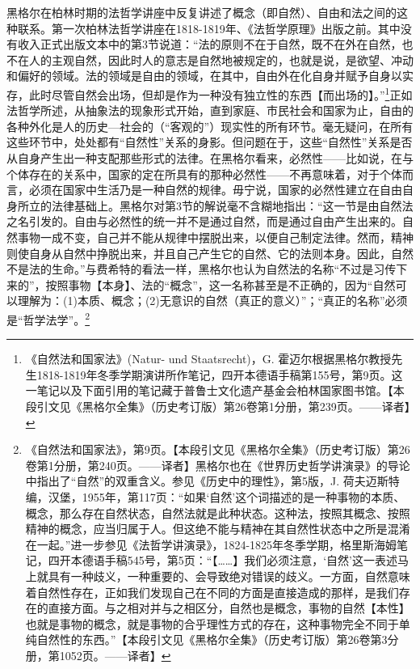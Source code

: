 黑格尔在柏林时期的法哲学讲座中反复讲述了概念（即自然）、自由和法之间的这种联系。第一次柏林法哲学讲座在1818-1819年、《法哲学原理》出版之前。其中没有收入正式出版文本中的第3节说道：“法的原则不在于自然，既不在外在自然，也不在人的主观自然，因此时人的意志是自然地被规定的，也就是说，是欲望、冲动和偏好的领域。法的领域是自由的领域，在其中，自由外在化自身并赋予自身以实存，此时尽管自然会出场，但却是作为一种没有独立性的东西【而出场的】。”\footnote{《自然法和国家法》(Natur- und Staatsrecht)，G. 霍迈尔根据黑格尔教授先生1818-1819年冬季学期演讲所作笔记，四开本德语手稿第155号，第9页。这一笔记以及下面引用的笔记藏于普鲁士文化遗产基金会柏林国家图书馆。【本段引文见《黑格尔全集》（历史考订版）第26卷第1分册，第239页。——译者】}正如法哲学所述，从抽象法的现象形式开始，直到家庭、市民社会和国家为止，自由的各种外化是人的历史—社会的（“客观的”）现实性的所有环节。毫无疑问，在所有这些环节中，处处都有“自然性”关系的身影。但问题在于，这些“自然性”关系是否从自身产生出一种支配那些形式的法律。在黑格尔看来，必然性——比如说，在与个体存在的关系中，国家的定在所具有的那种必然性——不再意味着，对于个体而言，必须在国家中生活乃是一种自然的规律。毋宁说，国家的必然性建立在自由自身所立的法律基础上。黑格尔对第3节的解说毫不含糊地指出：“这一节是由自然法之名引发的。自由与必然性的统一并不是通过自然，而是通过自由产生出来的。自然事物一成不变，自己并不能从规律中摆脱出来，以便自己制定法律。然而，精神则使自身从自然中挣脱出来，并且自己产生它的自然、它的法则本身。因此，自然不是法的生命。”与费希特的看法一样，黑格尔也认为自然法的名称“不过是习传下来的”，按照事物【本身】、法的“概念”，这一名称甚至是不正确的，因为“自然可以理解为：(1)本质、概念；(2)无意识的自然（真正的意义）”；“真正的名称”必须是“哲学法学”。\footnote{《自然法和国家法》，第9页。【本段引文见《黑格尔全集》（历史考订版）第26卷第1分册，第240页。——译者】黑格尔也在《世界历史哲学讲演录》的导论中指出了“自然”的双重含义。参见《历史中的理性》，第5版，J. 荷夫迈斯特编，汉堡，1955年，第117页：“如果‘自然’这个词描述的是一种事物的本质、概念，那么存在自然状态，自然法就是此种状态。这种法，按照其概念、按照精神的概念，应当归属于人。但这绝不能与精神在其自然性状态中之所是混淆在一起。”进一步参见《法哲学讲演录》，1824-1825年冬季学期，格里斯海姆笔记，四开本德语手稿545号，第5页：“【……】我们必须注意，‘自然’这一表述马上就具有一种歧义，一种重要的、会导致绝对错误的歧义。一方面，自然意味着自然性存在，正如我们发现自己在不同的方面是直接造成的那样，是我们存在的直接方面。与之相对并与之相区分，自然也是概念，事物的自然【本性】也就是事物的概念，就是事物的合乎理性方式的存在，这种事物完全不同于单纯自然性的东西。”【本段引文见《黑格尔全集》（历史考订版）第26卷第3分册，第1052页。——译者】}

